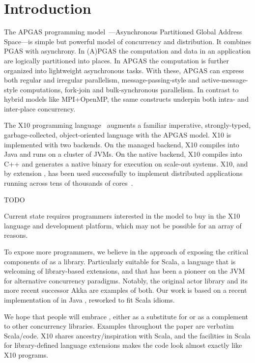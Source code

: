 \section{Introduction}

The APGAS programming model~\cite{amp10}---Asynchronous Partitioned Global Address Space---is simple but powerful
model of concurrency and distribution. It combines PGAS with asynchrony.
In (A)PGAS the computation and data in an application are logically partitioned into places.
In APGAS the computation is further organized into lightweight asynchronous tasks.
With these, APGAS can express both
regular and irregular parallelism, message-passing-style and
active-message-style computations, fork-join and bulk-synchronous
parallelism.  In contrast to hybrid models like MPI+OpenMP, the same
constructs underpin both intra- and inter-place concurrency.

The X10 programming language~\cite{oopsla05} augments a familiar imperative, strongly-typed, garbage-collected, object-oriented language with the APGAS model. X10 is implemented with two backends. On the managed backend, X10
compiles into Java and runs on a cluster of JVMs. On the native backend, X10 compiles into C++ and generates a native binary
for execution on scale-out systems.
X10, and by extension
\apgas, has been used successfully to implement distributed applications
running across tens of thousands of cores~\cite{TardieuETAL14X10ApgasAtPetascale}.

TODO

Current state requires programmers interested in the \apgas model to buy in the
X10 language and development platform, which may not be possible for an array
of reasons.

To expose more programmers, we believe in the approach of exposing the critical
components of \apgas as a library. Particularly suitable for Scala, a language
that is welcoming of library-based extensions, and that has been a pioneer on
the JVM for alternative concurrency paradigms. Notably, the original actor
library and its more recent successor Akka are examples of both. Our work is
based on a recent implementation of \apgas in Java \cite{APGASJava}, reworked to
fit Scala idioms.

We hope that people will embrace \apgas, either as a substitute for or as a
complement to other concurrency libraries. Examples throughout the paper are
verbatim Scala/\apgas code. X10 shares ancestry/inspiration with Scala, and the
facilities in Scala for library-defined language extensions makes the code look
almost exactly like X10 programs.

